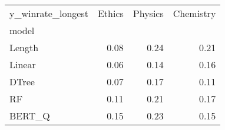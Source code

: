 \begin{tabular}{lrrr}
\toprule
y\_winrate\_longest &  Ethics &  Physics &  Chemistry \\
model  &         &          &            \\
\midrule
Length &    0.08 &     0.24 &       0.21 \\
Linear &    0.06 &     0.14 &       0.16 \\
DTree  &    0.07 &     0.17 &       0.11 \\
RF     &    0.11 &     0.21 &       0.17 \\
BERT\_Q &    0.15 &     0.23 &       0.15 \\
\bottomrule
\end{tabular}
